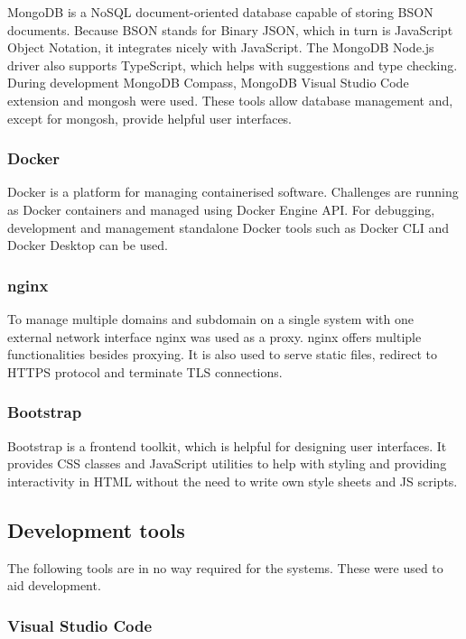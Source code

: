 MongoDB is a NoSQL document-oriented database capable of storing BSON documents. Because BSON stands for Binary JSON, which in turn is JavaScript Object Notation, it integrates nicely with JavaScript. The MongoDB Node.js driver also supports TypeScript, which helps with suggestions and type checking.\\
During development MongoDB Compass, MongoDB Visual Studio Code extension and mongosh were used. These tools allow database management and, except for mongosh, provide helpful user interfaces.

\subsubsection{Docker}

Docker is a platform for managing containerised software. Challenges are running as Docker containers and managed using Docker Engine API. For debugging, development and management standalone Docker tools such as Docker CLI and Docker Desktop can be used.

\subsubsection{nginx}

To manage multiple domains and subdomain on a single system with one external network interface nginx was used as a proxy. nginx offers multiple functionalities besides proxying. It is also used to serve static files, redirect to HTTPS protocol and terminate TLS connections.

\subsubsection{Bootstrap}

Bootstrap is a frontend toolkit, which is helpful for designing user interfaces. It provides CSS classes and JavaScript utilities to help with styling and providing interactivity in HTML without the need to write own style sheets and JS scripts.

\subsection{Development tools}

The following tools are in no way required for the systems. These were used to aid development.

\subsubsection{Visual Studio Code}

